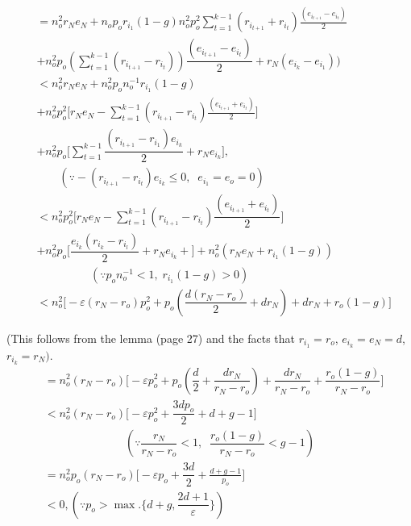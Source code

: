 \begin{align*}
& = n^2_o r_N e_N +  n_o p_o r_{i_1} (1-g) n^2_o p^2_o
\sum\limits_{t=1}^{k-1} (r_{i_{t+1}} + r_{i_t})
\frac{(e_{i_{t+1}} - e_{i_t})}{2}\\
& + n^2_op_o (\sum\limits_{t=1}^{k-1} (r_{i_{t+1}} - r_{i_t}))
\dfrac{(e_{i_{t+1}} - e_{i_t})}{2} + r_N (e_{i_k} -
e_{i_1}))\\
& < n^2_o r_N e_N + n^2_o p_o n_o^{-1} r_{i_1} (1-g)\\
& + n^2_o p^2_o \bigg[ r_N e_N  -\sum\limits_{t=1}^{k-1} (r_{i_{t+1}}
  - r_{i_t})   \frac{(e_{i_{t+1}} + e_{i_t})}{2}   \bigg]\\
& + n^2_op_o \bigg[\sum\limits_{t=1}^{k-1}  \dfrac{(r_{i_{t+1}} -
    r_{i_1}) e_{i_k}}{2} + r_N e_{i_k} \bigg],\\
&\qquad (\because- (r_{i_{t+1}} - 
r_{i_t})  e_{i_k} \le 0, \;\; e_{i_1} = e_o = 0)\\ 
&  < n^2_o p^2_o \bigg[ r_N e_N -  \sum\limits_{t=1}^{k-1}
  (r_{i_{t+1}} - r_{i_t})   \dfrac{(e_{i_{t+1}} + e_{i_t})}{2}   \bigg]\\ 
& + n^2_o p_o \bigg[ \dfrac{e_{i_k} (r_{i_k} - r_{i_l})}{2}
  + r_N e_{i_k} +\bigg] + n^2_o (r_N e_N + r_{i_1} (1-g)) \\
& \hspace{2cm} (\because
p_on_o^{-1} < 1,   \; r_{i_1} (1-g) > 0)\\
& < n^2_o \bigg[ - \varepsilon (r_N -r_o) p^2_o + p_o
  (\dfrac{d(r_N-r_o)}{2} +  dr_N)  + dr_N + r_o (1-g) \bigg]  
\end{align*}

(This follows from the lemma (page 27) and the facts that
$r_{i_1} = r_o$,  $e_{i_k} = e_N =d$, $r_{i_k} = r_N)$. 
\begin{align*}
& = n^2_o (r_N - r_o) \bigg[ - \varepsilon p^2_o + p_o (\dfrac{d}{2} +
  \dfrac{dr_N} {r_N-r_o}) + \dfrac{dr_N} {r_N-r_o} + \dfrac{r_o(1-g)}
        {r_N-r_o} \bigg] \\
& < n^2_o (r_N -r_o) \bigg[ -\varepsilon p^2_o +
  \dfrac{3dp_o}{2} + d + g - 1 \bigg]\\
& \hspace{3cm} (\because \dfrac{r_N}{r_N -r_o} <1, \;\;
\dfrac{r_o (1-g)}{r_N - r_o} < g-1)\\
& = n^2_op_o(r_N-r_o) \bigg [-\varepsilon p_o + \dfrac{3d}{2} +
  \frac{d+g-1}{p_o} \bigg]\\
& < 0, (\because p_o  > \max . \{d+g, \dfrac{2d+1}{\varepsilon}\} )
\end{align*}\pageoriginale


